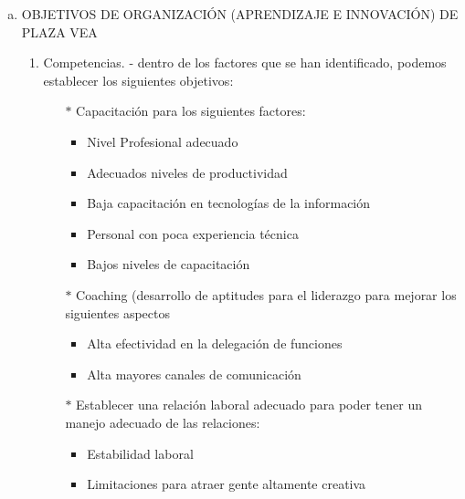 \begin{enumerate}[a)]
\begin{itemize}
		\end{itemize}

	\item OBJETIVOS DE ORGANIZACIÓN (APRENDIZAJE E INNOVACIÓN) DE PLAZA VEA

		\begin{enumerate}[1.]
  			  \item Competencias. - dentro de los factores que se han identificado, podemos establecer los
siguientes objetivos:
			\begin{itemize}
  			  \item[$*$] Capacitación para los siguientes factores:

				\begin{itemize}

  				  \item Nivel Profesional adecuado
				  \item Adecuados niveles de productividad
				  \item Baja capacitación en tecnologías de la información
				  \item Personal con poca experiencia técnica
				 \item Bajos niveles de capacitación

				\end{itemize}

			 \item[$*$] Coaching (desarrollo de aptitudes para el liderazgo para mejorar los siguientes aspectos

				\begin{itemize}

  				  \item Alta efectividad en la delegación de funciones
				  \item Alta mayores canales de comunicación

				\end{itemize}

			 \item[$*$] Establecer una relación laboral adecuado para poder tener un manejo adecuado de las relaciones:

				\begin{itemize}

  				  \item Estabilidad laboral
				  \item Limitaciones para atraer gente altamente creativa

				\end{itemize}


			\end{itemize}


\end{enumerate}
\end{enumerate}
